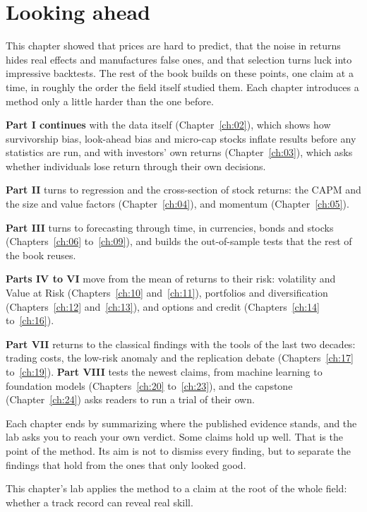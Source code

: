 \section{Looking ahead}
\label{sec:01-ahead}

This chapter showed that prices are hard to predict, that the noise in returns hides real effects and manufactures false ones, and that selection turns luck into impressive backtests. The rest of the book builds on these points, one claim at a time, in roughly the order the field itself studied them. Each chapter introduces a method only a little harder than the one before.

\textbf{Part I continues} with the data itself (Chapter~\ref{ch:02}), which shows how survivorship bias, look-ahead bias and micro-cap stocks inflate results before any statistics are run, and with investors' own returns (Chapter~\ref{ch:03}), which asks whether individuals lose return through their own decisions.

\textbf{Part II} turns to regression and the cross-section of stock returns: the CAPM and the size and value factors (Chapter~\ref{ch:04}), and momentum (Chapter~\ref{ch:05}).

\textbf{Part III} turns to forecasting through time, in currencies, bonds and stocks (Chapters~\ref{ch:06} to~\ref{ch:09}), and builds the out-of-sample tests that the rest of the book reuses.

\textbf{Parts IV to VI} move from the mean of returns to their risk: volatility and Value at Risk (Chapters~\ref{ch:10} and~\ref{ch:11}), portfolios and diversification (Chapters~\ref{ch:12} and~\ref{ch:13}), and options and credit (Chapters~\ref{ch:14} to~\ref{ch:16}).

\textbf{Part VII} returns to the classical findings with the tools of the last two decades: trading costs, the low-risk anomaly and the replication debate (Chapters~\ref{ch:17} to~\ref{ch:19}). \textbf{Part VIII} tests the newest claims, from machine learning to foundation models (Chapters~\ref{ch:20} to~\ref{ch:23}), and the capstone (Chapter~\ref{ch:24}) asks readers to run a trial of their own.

Each chapter ends by summarizing where the published evidence stands, and the lab asks you to reach your own verdict. Some claims hold up well. That is the point of the method. Its aim is not to dismiss every finding, but to separate the findings that hold from the ones that only looked good.

This chapter's lab applies the method to a claim at the root of the whole field: whether a track record can reveal real skill.

